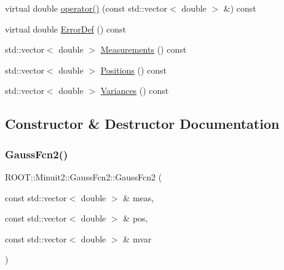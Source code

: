 \begin{DoxyCompactItemize}
\item 
virtual double \mbox{\hyperlink{classROOT_1_1Minuit2_1_1GaussFcn2_a1d9f5a8eb73400d54aea80d6dfd2ed37}{operator()}} (const std\+::vector$<$ double $>$ \&) const
\item 
virtual double \mbox{\hyperlink{classROOT_1_1Minuit2_1_1GaussFcn2_ac240f7b6ecbb7bf842d786e3914c620a}{Error\+Def}} () const
\item 
std\+::vector$<$ double $>$ \mbox{\hyperlink{classROOT_1_1Minuit2_1_1GaussFcn2_acd862030b2db540b0a7210e78c2f913f}{Measurements}} () const
\item 
std\+::vector$<$ double $>$ \mbox{\hyperlink{classROOT_1_1Minuit2_1_1GaussFcn2_a11faaa08de303ea203403c320c9e1f0a}{Positions}} () const
\item 
std\+::vector$<$ double $>$ \mbox{\hyperlink{classROOT_1_1Minuit2_1_1GaussFcn2_ae14a0349f83e8ffe7b2b1cda4e138113}{Variances}} () const
\end{DoxyCompactItemize}


\subsection{Constructor \& Destructor Documentation}
\mbox{\label{classROOT_1_1Minuit2_1_1GaussFcn2_a2904a79650d89e25591d84060e986271}} 
\subsubsection{\texorpdfstring{GaussFcn2()}{GaussFcn2()}\hspace{0.1cm}{\footnotesize\ttfamily [1/2]}}
{\footnotesize\ttfamily R\+O\+O\+T\+::\+Minuit2\+::\+Gauss\+Fcn2\+::\+Gauss\+Fcn2 (\begin{DoxyParamCaption}\item[{const std\+::vector$<$ double $>$ \&}]{meas,  }\item[{const std\+::vector$<$ double $>$ \&}]{pos,  }\item[{const std\+::vector$<$ double $>$ \&}]{mvar }\end{DoxyParamCaption})\hspace{0.3cm}{\ttfamily [inline]}}

